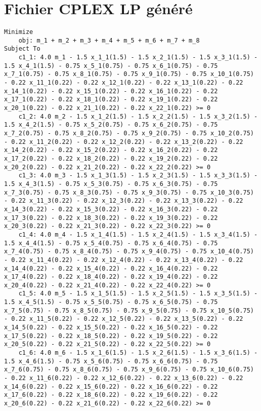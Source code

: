 \documentclass{article}[A4]
\begin{document}
\section{Fichier CPLEX LP généré}
\begin{lstlisting}
Minimize
	obj: m_1 + m_2 + m_3 + m_4 + m_5 + m_6 + m_7 + m_8
Subject To
	c1_1: 4.0 m_1 - 1.5 x_1_1(1.5) - 1.5 x_2_1(1.5) - 1.5 x_3_1(1.5) - 1.5 x_4_1(1.5) - 0.75 x_5_1(0.75) - 0.75 x_6_1(0.75) - 0.75 x_7_1(0.75) - 0.75 x_8_1(0.75) - 0.75 x_9_1(0.75) - 0.75 x_10_1(0.75) - 0.22 x_11_1(0.22) - 0.22 x_12_1(0.22) - 0.22 x_13_1(0.22) - 0.22 x_14_1(0.22) - 0.22 x_15_1(0.22) - 0.22 x_16_1(0.22) - 0.22 x_17_1(0.22) - 0.22 x_18_1(0.22) - 0.22 x_19_1(0.22) - 0.22 x_20_1(0.22) - 0.22 x_21_1(0.22) - 0.22 x_22_1(0.22) >= 0
	c1_2: 4.0 m_2 - 1.5 x_1_2(1.5) - 1.5 x_2_2(1.5) - 1.5 x_3_2(1.5) - 1.5 x_4_2(1.5) - 0.75 x_5_2(0.75) - 0.75 x_6_2(0.75) - 0.75 x_7_2(0.75) - 0.75 x_8_2(0.75) - 0.75 x_9_2(0.75) - 0.75 x_10_2(0.75) - 0.22 x_11_2(0.22) - 0.22 x_12_2(0.22) - 0.22 x_13_2(0.22) - 0.22 x_14_2(0.22) - 0.22 x_15_2(0.22) - 0.22 x_16_2(0.22) - 0.22 x_17_2(0.22) - 0.22 x_18_2(0.22) - 0.22 x_19_2(0.22) - 0.22 x_20_2(0.22) - 0.22 x_21_2(0.22) - 0.22 x_22_2(0.22) >= 0
	c1_3: 4.0 m_3 - 1.5 x_1_3(1.5) - 1.5 x_2_3(1.5) - 1.5 x_3_3(1.5) - 1.5 x_4_3(1.5) - 0.75 x_5_3(0.75) - 0.75 x_6_3(0.75) - 0.75 x_7_3(0.75) - 0.75 x_8_3(0.75) - 0.75 x_9_3(0.75) - 0.75 x_10_3(0.75) - 0.22 x_11_3(0.22) - 0.22 x_12_3(0.22) - 0.22 x_13_3(0.22) - 0.22 x_14_3(0.22) - 0.22 x_15_3(0.22) - 0.22 x_16_3(0.22) - 0.22 x_17_3(0.22) - 0.22 x_18_3(0.22) - 0.22 x_19_3(0.22) - 0.22 x_20_3(0.22) - 0.22 x_21_3(0.22) - 0.22 x_22_3(0.22) >= 0
	c1_4: 4.0 m_4 - 1.5 x_1_4(1.5) - 1.5 x_2_4(1.5) - 1.5 x_3_4(1.5) - 1.5 x_4_4(1.5) - 0.75 x_5_4(0.75) - 0.75 x_6_4(0.75) - 0.75 x_7_4(0.75) - 0.75 x_8_4(0.75) - 0.75 x_9_4(0.75) - 0.75 x_10_4(0.75) - 0.22 x_11_4(0.22) - 0.22 x_12_4(0.22) - 0.22 x_13_4(0.22) - 0.22 x_14_4(0.22) - 0.22 x_15_4(0.22) - 0.22 x_16_4(0.22) - 0.22 x_17_4(0.22) - 0.22 x_18_4(0.22) - 0.22 x_19_4(0.22) - 0.22 x_20_4(0.22) - 0.22 x_21_4(0.22) - 0.22 x_22_4(0.22) >= 0
	c1_5: 4.0 m_5 - 1.5 x_1_5(1.5) - 1.5 x_2_5(1.5) - 1.5 x_3_5(1.5) - 1.5 x_4_5(1.5) - 0.75 x_5_5(0.75) - 0.75 x_6_5(0.75) - 0.75 x_7_5(0.75) - 0.75 x_8_5(0.75) - 0.75 x_9_5(0.75) - 0.75 x_10_5(0.75) - 0.22 x_11_5(0.22) - 0.22 x_12_5(0.22) - 0.22 x_13_5(0.22) - 0.22 x_14_5(0.22) - 0.22 x_15_5(0.22) - 0.22 x_16_5(0.22) - 0.22 x_17_5(0.22) - 0.22 x_18_5(0.22) - 0.22 x_19_5(0.22) - 0.22 x_20_5(0.22) - 0.22 x_21_5(0.22) - 0.22 x_22_5(0.22) >= 0
	c1_6: 4.0 m_6 - 1.5 x_1_6(1.5) - 1.5 x_2_6(1.5) - 1.5 x_3_6(1.5) - 1.5 x_4_6(1.5) - 0.75 x_5_6(0.75) - 0.75 x_6_6(0.75) - 0.75 x_7_6(0.75) - 0.75 x_8_6(0.75) - 0.75 x_9_6(0.75) - 0.75 x_10_6(0.75) - 0.22 x_11_6(0.22) - 0.22 x_12_6(0.22) - 0.22 x_13_6(0.22) - 0.22 x_14_6(0.22) - 0.22 x_15_6(0.22) - 0.22 x_16_6(0.22) - 0.22 x_17_6(0.22) - 0.22 x_18_6(0.22) - 0.22 x_19_6(0.22) - 0.22 x_20_6(0.22) - 0.22 x_21_6(0.22) - 0.22 x_22_6(0.22) >= 0

\end{lstlisting}
\end{document}
